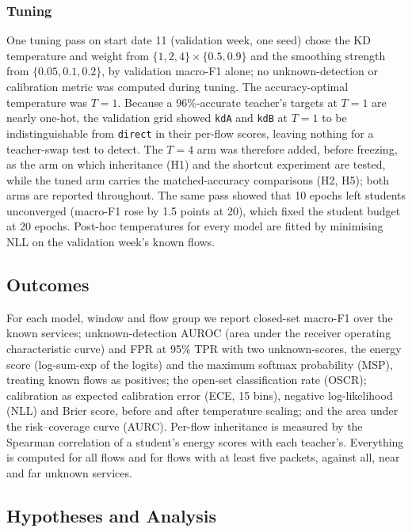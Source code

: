 \documentclass[journal]{IEEEtran}
\newcommand{\kd}[1]{\texttt{#1}}
\begin{document}
\subsubsection*{Tuning}
One tuning pass on start date 11 (validation week, one seed) chose the KD temperature and weight from $\{1,2,4\}\times\{0.5,0.9\}$ and the smoothing strength from $\{0.05,0.1,0.2\}$, by validation macro-F1 alone; no unknown-detection or calibration metric was computed during tuning. The accuracy-optimal temperature was $T=1$. Because a 96\%-accurate teacher's targets at $T=1$ are nearly one-hot, the validation grid showed \kd{kdA} and \kd{kdB} at $T=1$ to be indistinguishable from \kd{direct} in their per-flow scores, leaving nothing for a teacher-swap test to detect. The $T=4$ arm was therefore added, before freezing, as the arm on which inheritance (H1) and the shortcut experiment are tested, while the tuned arm carries the matched-accuracy comparisons (H2, H5); both arms are reported throughout. The same pass showed that 10 epochs left students unconverged (macro-F1 rose by 1.5 points at 20), which fixed the student budget at 20 epochs. Post-hoc temperatures for every model are fitted by minimising NLL on the validation week's known flows.

\subsection{Outcomes}

For each model, window and flow group we report closed-set macro-F1 over the known services; unknown-detection AUROC (area under the receiver operating characteristic curve) and FPR at 95\% TPR with two unknown-scores, the energy score (log-sum-exp of the logits) and the maximum softmax probability (MSP), treating known flows as positives; the open-set classification rate (OSCR); calibration as expected calibration error (ECE, 15 bins), negative log-likelihood (NLL) and Brier score, before and after temperature scaling; and the area under the risk--coverage curve (AURC). Per-flow inheritance is measured by the Spearman correlation of a student's energy scores with each teacher's. Everything is computed for all flows and for flows with at least five packets, against all, near and far unknown services.

\subsection{Hypotheses and Analysis}
\label{sec:analysis}
\end{document}
